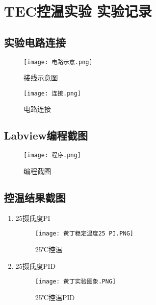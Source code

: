 \documentclass[dvipsnames, svgnames,a4paper,11pt]{article}
\begin{document}
	\section{TEC控温实验  \quad\heiti 实验记录}
	
	\subsection{实验电路连接}
	\begin{figure}[H]
		\centering
		\begin{minipage}[b]{0.45\textwidth}
			\centering
			\texttt{[image: 电路示意.png]}
			\caption{接线示意图}
			\label{fig:接线示意图}
		\end{minipage}
		\hspace{1cm}
		\begin{minipage}[b]{0.45\textwidth}
			\centering
			\texttt{[image: 连接.png]}
			\caption{电路连接}
			\label{fig:电路连接}
		\end{minipage}
	\end{figure}
	\subsection{Labview编程截图}
	
	\begin{figure}[{H}]
		\centering
		\texttt{[image: 程序.png]}
		\caption{编程截图}
		\label{}
	\end{figure}
	
	\clearpage
	
	
	\subsection{控温结果截图}
	\begin{enumerate}
		\item 25摄氏度PI
		
\begin{figure}[{H}]
	\centering
	\texttt{[image: 黄丁稳定温度25 PI.PNG]}
	\caption{25℃控温}
	\label{}
\end{figure}
\item 25摄氏度PID
\begin{figure}[{H}]
	\centering
	\texttt{[image: 黄丁实验图象.PNG]}
	\caption{25℃控温PID}
	\label{}
\end{figure}
	\end{enumerate}
\end{document}
